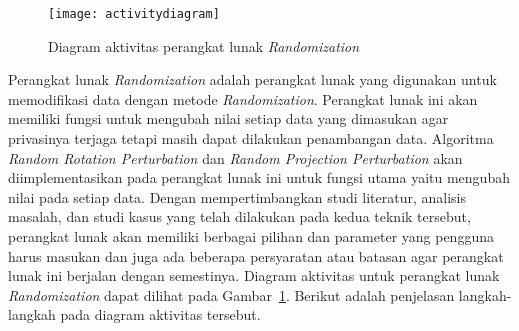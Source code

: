 \begin{figure}
    \centering
    \texttt{[image: activitydiagram]}
    \caption{Diagram aktivitas perangkat lunak \textit{Randomization}}
    \label{fig:activitydiagram}
\end{figure}

Perangkat lunak \textit{Randomization} adalah perangkat lunak yang digunakan untuk memodifikasi data dengan metode \textit{Randomization}. Perangkat lunak ini akan memiliki fungsi untuk mengubah nilai setiap data yang dimasukan agar privasinya terjaga tetapi masih dapat dilakukan penambangan data. Algoritma \textit{Random Rotation Perturbation} dan \textit{Random Projection Perturbation} akan diimplementasikan pada perangkat lunak ini untuk fungsi utama yaitu mengubah nilai pada setiap data. Dengan mempertimbangkan studi literatur, analisis masalah, dan studi kasus yang telah dilakukan pada kedua teknik tersebut, perangkat lunak akan memiliki berbagai pilihan dan parameter yang pengguna harus masukan dan juga ada beberapa persyaratan atau batasan agar perangkat lunak ini berjalan dengan semestinya. Diagram aktivitas untuk perangkat lunak \textit{Randomization} dapat dilihat pada Gambar~\ref{fig:activitydiagram}. Berikut adalah penjelasan langkah-langkah pada diagram aktivitas tersebut.
